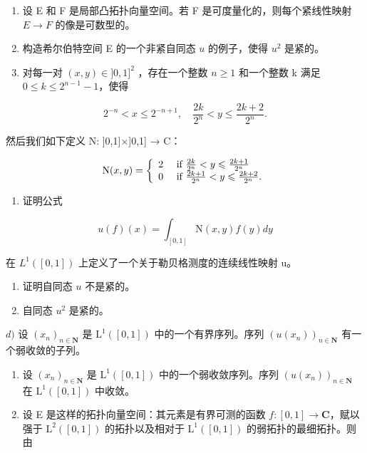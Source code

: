 \begin{enumerate}
\def\labelenumi{\arabic{enumi})}
\setcounter{enumi}{6}
\item
  设 E 和 F 是局部凸拓扑向量空间。若 F 是可度量化的，则每个紧线性映射 \(E \rightarrow F\) 的像是可数型的。
\item
  构造希尔伯特空间 E 的一个非紧自同态 \(u\) 的例子，使得 \(u^2\) 是紧的。
\item
  对每一对 \((x,y)\in]0,1]^{2}\) ，存在一个整数 \(n\geqslant1\) 和一个整数 k 满足 \(0\leqslant k\leqslant2^{n-1}-1\)，使得
\end{enumerate}

\[
2 ^ {- n} <   x \leqslant 2 ^ {- n + 1}, \quad \frac {2 k}{2 ^ {n}} <   y \leqslant \frac {2 k + 2}{2 ^ {n}}.
\]

然后我们如下定义 N: ]0,1]×]0,1] → C：

\[
\mathrm{N} (x, y) = \left\{ \begin{array}{l l} 2 & \text { if } \frac {2 k}{2 ^ {n}} <   y \leqslant \frac {2 k + 1}{2 ^ {n}} \\ 0 & \text { if } \frac {2 k + 1}{2 ^ {n}} <   y \leqslant \frac {2 k + 2}{2 ^ {n}}. \end{array} \right.
\]

\begin{enumerate}
\def\labelenumi{\alph{enumi})}
\tightlist
\item
  证明公式
\end{enumerate}

\[
u (f) (x) = \int_ {[ 0, 1 ]} \mathrm{N} (x, y) f (y) d y
\]

在 \(L^{1}([0,1])\) 上定义了一个关于勒贝格测度的连续线性映射 u。

\begin{enumerate}
\def\labelenumi{\alph{enumi})}
\setcounter{enumi}{1}
\item
  证明自同态 \(u\) 不是紧的。
\item
  自同态 \(u^2\) 是紧的。
\end{enumerate}

\(d)\) 设 \((x_{n})_{n\in \mathbf{N}}\) 是 \(\mathrm{L}^1 ([0,1])\) 中的一个有界序列。序列 \((u(x_n))_{n\in \mathbf{N}}\) 有一个弱收敛的子列。

\begin{enumerate}
\def\labelenumi{\alph{enumi})}
\setcounter{enumi}{4}
\item
  设 \((x_{n})_{n\in \mathbf{N}}\) 是 \(\mathrm{L}^1 ([0,1])\) 中的一个弱收敛序列。序列 \((u(x_{n}))_{n\in \mathbf{N}}\) 在 \(\mathrm{L}^1 ([0,1])\) 中收敛。
\item
  设 E 是这样的拓扑向量空间：其元素是有界可测的函数 \(f\colon[0,1]\to\mathbf{C}\)，赋以强于 \(\mathrm{L}^{2}([0,1])\) 的拓扑以及相对于 \(\mathrm{L}^{1}([0,1])\) 的弱拓扑的最细拓扑。则由
\end{enumerate}

